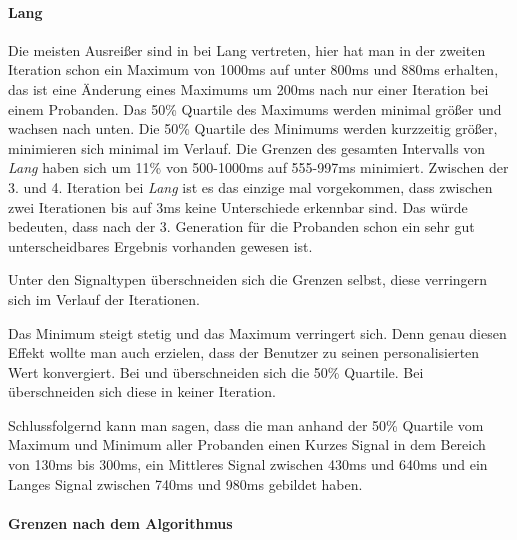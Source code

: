 \paragraph{Lang}
Die meisten Ausrei{\ss}er sind in bei Lang vertreten, hier hat man in der zweiten Iteration schon ein Maximum von 1000ms auf unter 800ms und 880ms erhalten, das ist eine {\"A}nderung eines Maximums um 200ms nach nur einer Iteration bei einem Probanden.
Das 50\% Quartile des Maximums werden minimal gr{\"o}{\ss}er und wachsen nach unten.
Die 50\% Quartile des Minimums werden kurzzeitig gr{\"o}{\ss}er, minimieren sich minimal im Verlauf.
Die Grenzen des gesamten Intervalls von \textit{Lang} haben sich um 11\% von 500-1000ms auf 555-997ms minimiert.
Zwischen der 3. und 4. Iteration bei \textit{Lang} ist es das einzige mal vorgekommen, dass zwischen zwei Iterationen bis auf 3ms keine Unterschiede erkennbar sind.
Das w{\"u}rde bedeuten, dass nach der 3. Generation f{\"u}r die Probanden schon ein sehr gut unterscheidbares Ergebnis vorhanden gewesen ist.


Unter den Signaltypen {\"u}berschneiden sich die Grenzen selbst, diese verringern sich im Verlauf der Iterationen.

Das Minimum steigt stetig und das Maximum verringert sich. 
Denn genau diesen Effekt wollte man auch erzielen, dass der Benutzer zu seinen personalisierten Wert konvergiert.
Bei  und  {\"u}berschneiden sich die 50\% Quartile. 
Bei  {\"u}berschneiden sich diese in keiner Iteration.

Schlussfolgernd kann man sagen, dass die man anhand der 50\% Quartile vom Maximum und Minimum aller Probanden einen Kurzes Signal in dem Bereich von 130ms bis 300ms, ein Mittleres Signal zwischen 430ms und 640ms und ein Langes Signal zwischen 740ms und 980ms gebildet haben. 




\paragraph{Grenzen nach dem Algorithmus}

